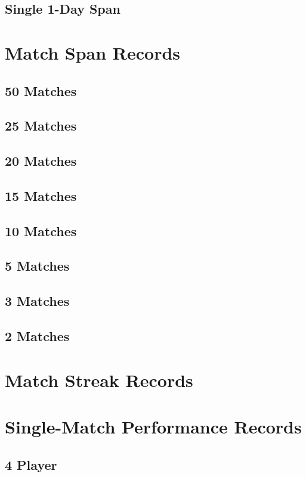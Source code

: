    \section{Single 1-Day Span}
    
  \chapter{Match Span Records}
    \section{50 Matches}
    \section{25 Matches}
    \section{20 Matches}
    \section{15 Matches}
    \section{10 Matches}
    \section{5 Matches}
    \section{3 Matches}
    \section{2 Matches}
  \chapter{Match Streak Records}
  
  \chapter{Single-Match Performance Records}
    \section{4 Player}
      
